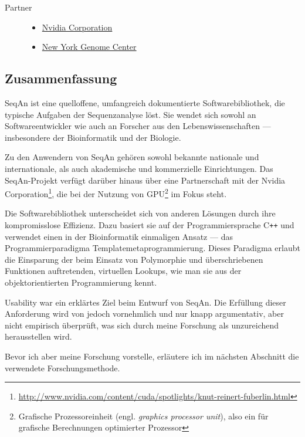 \begin{description}
\item[Partner] \hfill
\begin{itemize}
\itemsep1pt\parskip0pt
\item \href{http://www.nvidia.com}{Nvidia Corporation}
\item \href{http://www.nygenome.org}{New York Genome Center}
\end{itemize}
\end{description}



\subsection{Zusammenfassung}

SeqAn ist eine quelloffene, umfangreich dokumentierte Softwarebibliothek, die typische Aufgaben der Sequenzanalyse löst. Sie wendet sich sowohl an Softwareentwickler wie auch an Forscher aus den Lebenswissenschaften --- insbesondere der Bioinformatik und der Biologie.

Zu den Anwendern von SeqAn gehören sowohl bekannte nationale und internationale, als auch akademische und kommerzielle Einrichtungen. Das SeqAn-Projekt verfügt darüber hinaus über eine Partnerschaft mit der Nvidia Corporation\footnote{\url{http://www.nvidia.com/content/cuda/spotlights/knut-reinert-fuberlin.html}}, die bei der Nutzung von GPU\footnote{Grafische Prozessoreinheit (engl. \textit{graphics processor unit}), also ein für grafische Berechnungen optimierter Prozessor} im Fokus steht.

Die Softwarebibliothek unterscheidet sich von anderen Lösungen durch ihre kompromisslose Effizienz. Dazu basiert sie auf der Programmiersprache C{}\verb!++! und verwendet einen in der Bioinformatik einmaligen Ansatz --- das Programmierparadigma Templatemetaprogrammierung. Dieses Paradigma erlaubt die Einsparung der beim Einsatz von Polymorphie und überschriebenen Funktionen auftretenden, virtuellen Lookups, wie man sie aus der objektorientierten Programmierung kennt.

Usability war ein erklärtes Ziel beim Entwurf von SeqAn. Die Erfüllung dieser Anforderung wird von \cite{GogolDoring:2009vz} jedoch vornehmlich und nur knapp argumentativ, aber nicht empirisch überprüft, was sich durch meine Forschung als unzureichend herausstellen wird.

Bevor ich aber meine Forschung vorstelle, erläutere ich im nächsten Abschnitt die verwendete Forschungsmethode.






